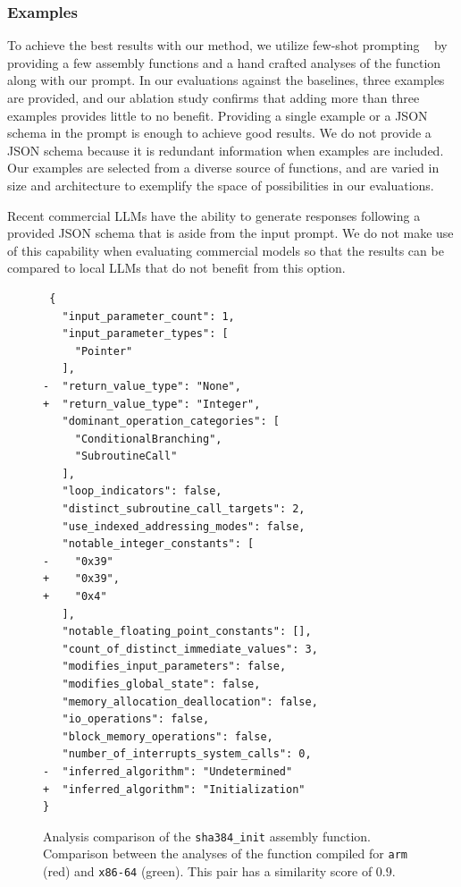 \subsubsection{Examples}

To achieve the best results with our method, we utilize few-shot prompting ~\cite{few-shot} by providing
a few assembly functions and a hand crafted analyses of the function along with our prompt.
In our evaluations against the baselines, three examples are provided, and our ablation study confirms that adding more than three examples provides
little to no benefit. Providing a single example or a JSON schema in the prompt is enough to achieve good results. We do not
provide a JSON schema because it is redundant information when examples are included. Our examples are selected from a
diverse source of functions, and are varied in size and architecture to exemplify the space of possibilities in our evaluations.

Recent commercial LLMs have the ability to generate responses following a provided JSON schema that is aside from the input prompt.
We do not make use of this capability when evaluating commercial models so that the results can be compared to local LLMs
that do not benefit from this option.

\begin{figure}[ht]
\centering
\begin{minipage}{0.95\linewidth}
\begin{verbatim}
 {
   "input_parameter_count": 1,
   "input_parameter_types": [
     "Pointer"
   ],
-  "return_value_type": "None",
+  "return_value_type": "Integer",
   "dominant_operation_categories": [
     "ConditionalBranching",
     "SubroutineCall"
   ],
   "loop_indicators": false,
   "distinct_subroutine_call_targets": 2,
   "use_indexed_addressing_modes": false,
   "notable_integer_constants": [
-    "0x39"
+    "0x39",
+    "0x4"
   ],
   "notable_floating_point_constants": [],
   "count_of_distinct_immediate_values": 3,
   "modifies_input_parameters": false,
   "modifies_global_state": false,
   "memory_allocation_deallocation": false,
   "io_operations": false,
   "block_memory_operations": false,
   "number_of_interrupts_system_calls": 0,
-  "inferred_algorithm": "Undetermined"
+  "inferred_algorithm": "Initialization"
}
\end{verbatim}
\caption{Analysis comparison of the \texttt{sha384\_init} assembly function. Comparison between the analyses of the function compiled 
for \texttt{arm} (red) and \texttt{x86-64} (green). This pair has a similarity score of \(0.9\).}
\label{feature-diff}
\end{minipage}
\end{figure}

